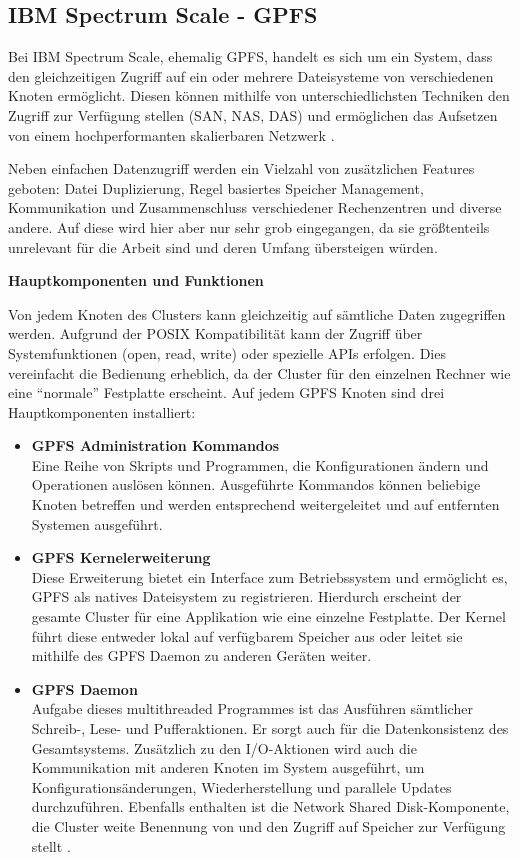 \subsection{IBM Spectrum Scale - GPFS}

Bei IBM Spectrum Scale, ehemalig \ac{GPFS}, handelt es sich um ein System, dass den gleichzeitigen Zugriff auf ein oder mehrere Dateisysteme von verschiedenen Knoten ermöglicht. Diesen können mithilfe von unterschiedlichsten Techniken den Zugriff zur Verfügung stellen (SAN, NAS, DAS) und ermöglichen das Aufsetzen von einem hochperformanten skalierbaren Netzwerk \parencite[S. 1]{ibm.2017}.

Neben einfachen Datenzugriff werden ein Vielzahl von zusätzlichen Features geboten: Datei Duplizierung, Regel basiertes Speicher Management, Kommunikation und Zusammenschluss verschiedener Rechenzentren und diverse andere. Auf diese wird hier aber nur sehr grob eingegangen, da sie größtenteils unrelevant für die Arbeit sind und deren Umfang übersteigen würden.

\textbf{Hauptkomponenten und Funktionen}

Von jedem Knoten des Clusters kann gleichzeitig auf sämtliche Daten zugegriffen werden. Aufgrund der \gls{POSIX} Kompatibilität kann der Zugriff über Systemfunktionen (open, read, write) oder spezielle APIs erfolgen. Dies vereinfacht die Bedienung erheblich, da der Cluster für den einzelnen Rechner wie eine ``normale'' Festplatte erscheint. Auf jedem GPFS Knoten sind drei Hauptkomponenten installiert:

\begin{itemize}
	\item \textbf{GPFS Administration Kommandos} \\
	Eine Reihe von Skripts und Programmen, die Konfigurationen ändern und Operationen auslösen können. Ausgeführte Kommandos können beliebige Knoten betreffen und werden entsprechend weitergeleitet und auf entfernten Systemen ausgeführt.
	\item \textbf{GPFS Kernelerweiterung} \\
	Diese Erweiterung bietet ein Interface zum Betriebssystem und ermöglicht es, GPFS als natives Dateisystem zu registrieren. Hierdurch erscheint der gesamte Cluster für eine Applikation wie eine einzelne Festplatte. Der Kernel führt diese entweder lokal auf verfügbarem Speicher aus oder leitet sie mithilfe des GPFS Daemon zu anderen Geräten weiter.
	\item \textbf{GPFS Daemon} \\
	Aufgabe dieses multithreaded Programmes ist das Ausführen sämtlicher Schreib-, Lese- und Pufferaktionen. Er sorgt auch für die Datenkonsistenz des Gesamtsystems. Zusätzlich zu den I/O-Aktionen wird auch die Kommunikation mit anderen Knoten im System ausgeführt, um Konfigurationsänderungen, Wiederherstellung und parallele Updates durchzuführen.
	Ebenfalls enthalten ist die Network Shared Disk-Komponente, die Cluster weite Benennung von und den Zugriff auf Speicher zur Verfügung stellt \parencite[S. 6]{ibm.2017}.  
\end{itemize} 

